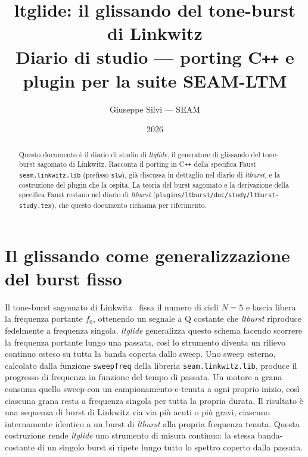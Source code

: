 \documentclass[11pt,a4paper]{article}
\title{ltglide: il glissando del tone-burst di Linkwitz\\\large Diario di studio --- porting C\texttt{++} e plugin per la suite SEAM-LTM}
\author{Giuseppe Silvi --- SEAM}
\date{2026}
\begin{document}
\maketitle
\begin{abstract}
Questo documento \`e il diario di studio di \emph{ltglide}, il generatore di glissando del tone-burst sagomato di Linkwitz.
Racconta il porting in C\texttt{++} della specifica Faust \texttt{seam.linkwitz.lib} (prefisso \texttt{slw}), gi\`a discussa in dettaglio nel diario di \emph{ltburst}, e la costruzione del plugin che la ospita.
La teoria del burst sagomato e la derivazione della specifica Faust restano nel diario di \emph{ltburst} (\texttt{plugins/ltburst/doc/study/ltburst-study.tex}), che questo documento richiama per riferimento.
\end{abstract}
\tableofcontents

\section{Il glissando come generalizzazione del burst fisso}\label{sec:generalizzazione}

Il tone-burst sagomato di Linkwitz~\cite{linkwitz1980shaped} fissa il numero di cicli $N=5$ e lascia libera la frequenza portante $f_0$, ottenendo un segnale a Q costante che \emph{ltburst} riproduce fedelmente a frequenza singola.
\emph{ltglide} generalizza questo schema facendo scorrere la frequenza portante lungo una passata, cos\`i lo strumento diventa un rilievo continuo esteso su tutta la banda coperta dallo sweep.
Uno sweep esterno, calcolato dalla funzione \texttt{sweepfreq} della libreria \texttt{seam.linkwitz.lib}, produce il progresso di frequenza in funzione del tempo di passata.
Un motore a grana consuma quello sweep con un campionamento-e-tenuta a ogni proprio inizio, cos\`i ciascuna grana resta a frequenza singola per tutta la propria durata.
Il risultato \`e una sequenza di burst di Linkwitz via via pi\`u acuti o pi\`u gravi, ciascuno internamente identico a un burst di \emph{ltburst} alla propria frequenza tenuta.
Questa costruzione rende \emph{ltglide} uno strumento di misura continuo: la stessa banda-costante di un singolo burst si ripete lungo tutto lo spettro coperto dalla passata.
\end{document}
